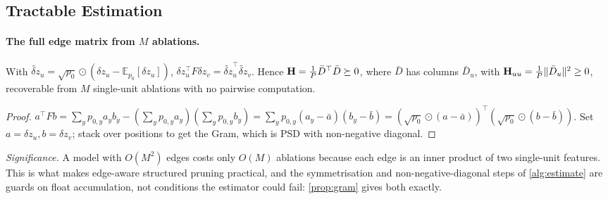 \subsection{Tractable Estimation}

\label{app:th-est}
\paragraph{The full edge matrix from $M$ ablations.}
\begin{proposition}\label{prop:gram}
With $\widetilde{\delta z}_u=\sqrt{p_0}\odot(\delta z_u-\mathbb{E}_{p_0}[\delta z_u])$,
$\delta z_u^\top F\delta z_v=\widetilde{\delta z}_u^\top\widetilde{\delta z}_v$. Hence
$\mathbf{H}=\tfrac1P\bar D^\top\bar D\succeq0$, where $\bar D$ has columns $\bar D_u$, with
$\mathbf{H}_{uu}=\tfrac1P\|\bar D_u\|^2\ge0$, recoverable from $M$ single-unit ablations with no pairwise
computation.
\end{proposition}
\begin{proof}
$a^\top Fb=\sum_y p_{0,y}a_yb_y-(\sum_y p_{0,y}a_y)(\sum_y p_{0,y}b_y)=\sum_y p_{0,y}(a_y-\bar a)(b_y-\bar b)
=(\sqrt{p_0}\odot(a-\bar a))^\top(\sqrt{p_0}\odot(b-\bar b))$. Set $a=\delta z_u,b=\delta z_v$; stack over
positions to get the Gram, which is PSD with non-negative diagonal.
\end{proof}
\noindent\emph{Significance.} A model with $O(M^2)$ edges costs only $O(M)$ ablations
because each edge is an inner product of two single-unit features. This is what makes edge-aware
structured pruning practical, and the symmetrisation and non-negative-diagonal steps of \cref{alg:estimate} are guards on float accumulation, not conditions the estimator could fail: \cref{prop:gram} gives both exactly.

